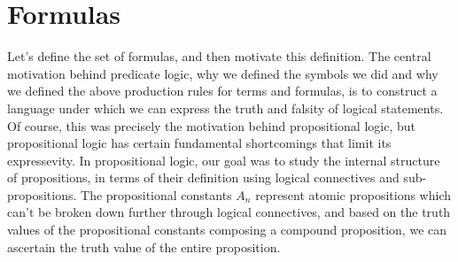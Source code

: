 \documentclass{article}
\begin{document}
\section{Formulas}
Let's define the set of formulas, and then motivate this definition.
\n
The central motivation behind predicate logic, why we defined the symbols we did and why we defined the above production rules for terms and formulas, is to construct a language under which we can express the truth and falsity of logical statements. Of course, this was precisely the motivation behind propositional logic, but propositional logic has certain fundamental shortcomings that limit its expressevity.
\nn
In propositional logic, our goal was to study the internal structure of propositions, in terms of their definition using logical connectives and sub-propositions. The propositional constants $ A_n $ represent atomic propositions which can't be broken down further through logical connectives, and based on the truth values of the propositional constants composing a compound proposition, we can ascertain the truth value of the entire proposition.
\nn
\end{document}
